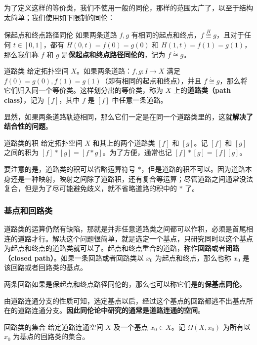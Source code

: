 为了定义这样的等价类，我们不使用一般的同伦，那样的范围太广了，以至于结构太简单；我们使用如下限制的同伦：

\begin{definition}{保起点和终点路径同伦}\label{HomT3_def2}
如果两条道路 $f, g$ 有相同的起点和终点，$f\overset{H}{\cong}g$，且对于任何 $t\in [0, 1]$，都有 $H(0, t)=f(0)=g(0)$ 和 $H(1, t)=f(1)=g(1)$，那么我们称 $f$ 和 $g$ 是\textbf{保起点和终点路径同伦的}，记为 $f\dot{\cong}g$。
\end{definition}

\begin{definition}{道路类}
给定拓扑空间 $X$。如果两条道路：$f, g:I\rightarrow X$ 满足 $f(0)=g(0), f(1)=g(1)$（即有相同的起点和终点），并且 $f\dot{\cong}g$，那么将它们归入同一个等价类。这样划分出的等价类，称为 $X$ 上的\textbf{道路类（path class）}，记为 $[f]$，其中 $f$ 是 $[f]$ 中任意一条道路。
\end{definition}

显然，如果两条道路轨迹相同，那么它们一定是在同一个道路类里的，这就\textbf{解决了结合性的问题}。

\begin{definition}{道路类的积}
给定拓扑空间 $X$ 和其上的两个道路类 $[f]$ 和 $[g]$。记 $[f]$ 和 $[g]$ 之间的积为 $[f]*[g]=[f*g]$。为了方便，通常也记 $[f]*[g]=[f][g]$。
\end{definition}

要注意的是，道路类的积可以省略运算符号 $*$，但是道路的积不可以。因为道路本身还是一种映射，映射之间除了道路积，还有复合等运算；尽管道路之间通常没法复合，但是为了尽可能避免歧义，就不省略道路的积中的 $*$ 了。

\subsubsection{基点和回路类}

道路类的运算仍然有缺陷，那就是并非任意道路类之间都可以作积，必须是首尾相连的道路才行。解决这个问题很简单，就是选定一个基点，只研究同时以这个基点为起点和终点的道路类就可以了。起点和终点重合的道路，称作\textbf{回路}或者\textbf{闭路（closed path）}。如果一条回路或者回路类以 $x_0$ 为起点和终点，那么也称 $x_0$ 是该回路或者回路类的基点。

两条回路如果是保起点和终点路径同伦的，那么也可以称它们是的\textbf{保基点同伦}。

由道路连通分支的性质可知，选定基点以后，经过这个基点的回路都逃不出基点所在的道路连通分支。\textbf{因此同伦论中研究的通常是道路连通的空间}。

\begin{definition}{回路类的集合}
给定道路连通空间 $X$ 及一个基点 $x_0\in X$。记 $\Omega(X, x_0)$ 为所有以 $x_0$ 为基点的回路类的集合。
\end{definition}

